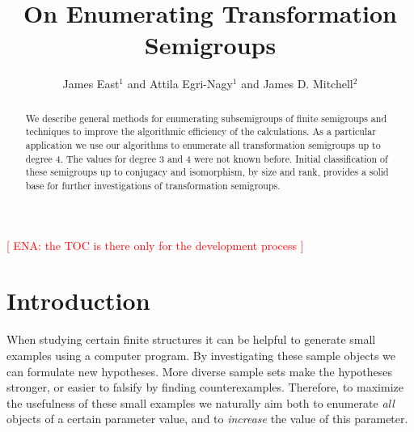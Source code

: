 \documentclass{amsart}
\newcommand{\todo}[1]{\textcolor{red}{ \small \textsf{[ #1 ]} \normalsize}}
\theoremstyle{plain}
\theoremstyle{definition}
\begin{document}
\title{On Enumerating Transformation Semigroups}
\author[J. East, A. Egri-Nagy, J.D. Mitchell]{James East$^1$ and Attila Egri-Nagy$^{1}$ and James D. Mitchell$^2$}
\address{$^1$Centre for Research in Mathematics, School of Computing, Engineering and Mathematics, University of Western Sydney (Parramatta Campus), Locked Bag 1797, Penrith, NSW 2751, Australia}
\address{$^2$ Mathematical Institute, University of St Andrews, North Haugh, St Andrews, Fife, KY16 9SS, Scotland}
\maketitle
\begin{abstract}
We describe general methods for enumerating subsemigroups of finite semigroups and techniques to improve the algorithmic efficiency of the calculations.
As a particular application we use our algorithms to enumerate all transformation semigroups up to degree 4.
The values for degree 3 and 4 were not known before.
Initial classification of these semigroups up to conjugacy and isomorphism, by
size and rank, provides a solid base for further investigations of
transformation semigroups.
\end{abstract}
\tableofcontents
\todo{ENA: the TOC is there only for the development process}
\section{Introduction}
When studying certain finite structures it can be helpful to generate small
examples using a computer program.
By investigating these sample objects we can formulate new hypotheses.
More diverse sample sets make the hypotheses stronger, or easier to falsify by finding counterexamples.
Therefore, to maximize the usefulness of these small examples we naturally aim both to enumerate \emph{all} objects of a certain
parameter value, and to \emph{increase} the value of this parameter.
\end{document}
